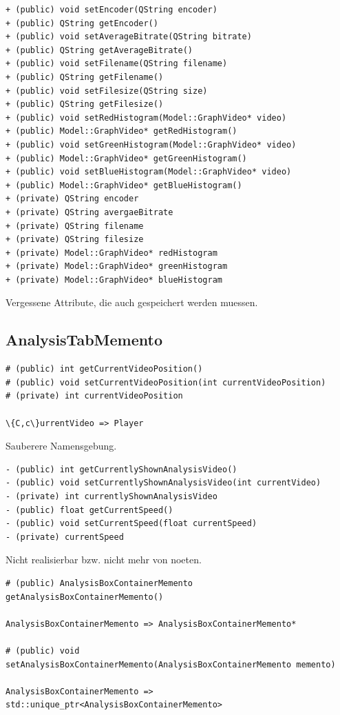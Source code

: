 \documentclass{scrartcl}
\begin{document}
{\begin{verbatim}
+ (public) void setEncoder(QString encoder)
+ (public) QString getEncoder()
+ (public) void setAverageBitrate(QString bitrate)
+ (public) QString getAverageBitrate()
+ (public) void setFilename(QString filename)
+ (public) QString getFilename()
+ (public) void setFilesize(QString size)
+ (public) QString getFilesize()
+ (public) void setRedHistogram(Model::GraphVideo* video)
+ (public) Model::GraphVideo* getRedHistogram()
+ (public) void setGreenHistogram(Model::GraphVideo* video)
+ (public) Model::GraphVideo* getGreenHistogram()
+ (public) void setBlueHistogram(Model::GraphVideo* video)
+ (public) Model::GraphVideo* getBlueHistogram()
+ (private) QString encoder
+ (private) QString avergaeBitrate
+ (private) QString filename
+ (private) QString filesize
+ (private) Model::GraphVideo* redHistogram
+ (private) Model::GraphVideo* greenHistogram
+ (private) Model::GraphVideo* blueHistogram
\end{verbatim}
Vergessene Attribute, die auch gespeichert werden muessen.

\subsection{AnalysisTabMemento}
\begin{verbatim}
# (public) int getCurrentVideoPosition()
# (public) void setCurrentVideoPosition(int currentVideoPosition)
# (private) int currentVideoPosition

\{C,c\}urrentVideo => Player
\end{verbatim}
Sauberere Namensgebung.
\begin{verbatim}
- (public) int getCurrentlyShownAnalysisVideo()
- (public) void setCurrentlyShownAnalysisVideo(int currentVideo)
- (private) int currentlyShownAnalysisVideo
- (public) float getCurrentSpeed()
- (public) void setCurrentSpeed(float currentSpeed)
- (private) currentSpeed
\end{verbatim}
Nicht realisierbar bzw. nicht mehr von noeten.
\begin{verbatim}
# (public) AnalysisBoxContainerMemento getAnalysisBoxContainerMemento()

AnalysisBoxContainerMemento => AnalysisBoxContainerMemento*

# (public) void setAnalysisBoxContainerMemento(AnalysisBoxContainerMemento memento)

AnalysisBoxContainerMemento => std::unique_ptr<AnalysisBoxContainerMemento>


\end{verbatim}}
\end{document}
